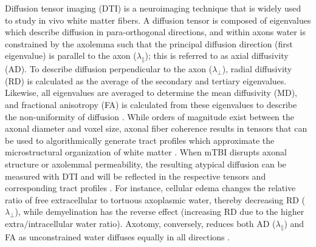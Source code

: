 \documentclass[]{imag-ms-template}
\begin{document}
Diffusion tensor imaging (DTI) is a neuroimaging technique that is widely used to study in vivo white matter fibers. A diffusion tensor is composed of eigenvalues which describe diffusion in para-orthogonal directions, and within axons water is constrained by the axolemma such that the principal diffusion direction (first eigenvalue) is parallel to the axon ($\lambda_\parallel$); this is referred to as axial diffusivity (AD). To describe diffusion perpendicular to the axon ($\lambda_\perp$), radial diffusivity (RD) is calculated as the average of the secondary and tertiary eigenvalues. Likewise, all eigenvalues are averaged to determine the mean diffusivity (MD), and fractional anisotropy (FA) is calculated from these eigenvalues to describe the non-uniformity of diffusion \parencite{mori1999ThreedimensionalTrackingAxonal,lilja2014VisualizingMeyersLoop,lindsey2023DiffusionWeightedImagingMild}. While orders of magnitude exist between the axonal diameter and voxel size, axonal fiber coherence results in tensors that can be used to algorithmically generate tract profiles which approximate the microstructural organization of white matter \parencite{kiselev2021MicrostructureDiffusionMRI,novikov2019QuantifyingBrainMicrostructure,danielian2010ReliabilityFiberTracking,reid2022TractspecificStatisticsBased,sarwar2019MappingConnectomesDiffusion,tournier2007RobustDeterminationFibre}. When mTBI disrupts axonal structure or axolemmal permeability, the resulting atypical diffusion can be measured with DTI and will be reflected in the respective tensors and corresponding tract profiles \parencite{macdonald2007DetectionTraumaticAxonal,macdonald2007DiffusionTensorImaging}. For instance, cellular edema changes the relative ratio of free extracellular to tortuous axoplasmic water, thereby decreasing RD ($\lambda_\perp$), while demyelination has the reverse effect (increasing RD due to the higher extra/intracellular water ratio). Axotomy, conversely, reduces both AD ($\lambda_\parallel$) and FA as unconstrained water diffuses equally in all directions \parencite{rosenblum2007CytotoxicEdemaMonitoring,liang2007CytotoxicEdemaMechanisms,borja2018DiffusionMRImaging,barkhoudarian2016MolecularPathophysiologyConcussive,pettus1996CharacterizationDistinctSet}.
\end{document}
